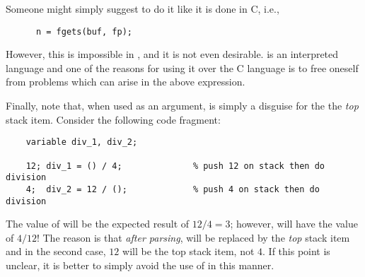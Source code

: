    Someone might simply suggest to do it like it is done in C, i.e.,
\begin{verbatim}
      n = fgets(buf, fp);
\end{verbatim}
   However, this is impossible in \slang{}, and it is not even desirable.
   \slang{} is an interpreted language and one of the reasons for using it
   over the C language is to free oneself from problems which can arise in
   the above  expression.

   Finally, note that, when used as an argument, \var{()} is simply a
   disguise for the the {\em top} stack item.  Consider the following code
   fragment:
\begin{verbatim}
    variable div_1, div_2;

    12; div_1 = () / 4;              % push 12 on stack then do division
    4;  div_2 = 12 / ();             % push 4 on stack then do division
\end{verbatim}
   The value of  will be the expected result of $12 / 4 = 3$;
   however,  will have the value of $4 / 12$!  The reason is
   that {\em after parsing}, \var{()} will be replaced by the {\em top}
   stack item and in the second case, $12$ will be the top stack item, not
   $4$.   If this point is unclear, it is better to simply avoid the use of
   \var{()} in this manner.

